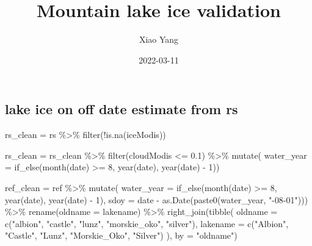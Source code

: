 \documentclass[
]{article}
\title{Mountain lake ice validation}
\author{Xiao Yang}
\date{2022-03-11}
\newenvironment{Shaded}{\begin{snugshade}}{\end{snugshade}}
\newcommand{\AttributeTok}[1]{\textcolor[rgb]{0.77,0.63,0.00}{#1}}
\newcommand{\DecValTok}[1]{\textcolor[rgb]{0.00,0.00,0.81}{#1}}
\newcommand{\FloatTok}[1]{\textcolor[rgb]{0.00,0.00,0.81}{#1}}
\newcommand{\FunctionTok}[1]{\textcolor[rgb]{0.00,0.00,0.00}{#1}}
\newcommand{\NormalTok}[1]{#1}
\newcommand{\OtherTok}[1]{\textcolor[rgb]{0.56,0.35,0.01}{#1}}
\newcommand{\SpecialCharTok}[1]{\textcolor[rgb]{0.00,0.00,0.00}{#1}}
\newcommand{\StringTok}[1]{\textcolor[rgb]{0.31,0.60,0.02}{#1}}
\begin{document}
\maketitle

\hypertarget{lake-ice-on-off-date-estimate-from-rs}{%
\subsection{lake ice on off date estimate from
rs}\label{lake-ice-on-off-date-estimate-from-rs}}

\begin{Shaded}
\begin{Highlighting}[]
\NormalTok{rs\_clean }\OtherTok{=}\NormalTok{ rs }\SpecialCharTok{\%\textgreater{}\%} \FunctionTok{filter}\NormalTok{(}\SpecialCharTok{!}\FunctionTok{is.na}\NormalTok{(iceModis))}

\NormalTok{rs\_clean }\OtherTok{=}\NormalTok{ rs\_clean }\SpecialCharTok{\%\textgreater{}\%} 
  \FunctionTok{filter}\NormalTok{(cloudModis }\SpecialCharTok{\textless{}=} \FloatTok{0.1}\NormalTok{) }\SpecialCharTok{\%\textgreater{}\%} 
  \FunctionTok{mutate}\NormalTok{(}
    \AttributeTok{water\_year =} \FunctionTok{if\_else}\NormalTok{(}\FunctionTok{month}\NormalTok{(date) }\SpecialCharTok{\textgreater{}=} \DecValTok{8}\NormalTok{, }\FunctionTok{year}\NormalTok{(date), }\FunctionTok{year}\NormalTok{(date) }\SpecialCharTok{{-}} \DecValTok{1}\NormalTok{))}

\NormalTok{ref\_clean }\OtherTok{=}\NormalTok{ ref }\SpecialCharTok{\%\textgreater{}\%} 
  \FunctionTok{mutate}\NormalTok{(}
    \AttributeTok{water\_year =} \FunctionTok{if\_else}\NormalTok{(}\FunctionTok{month}\NormalTok{(date) }\SpecialCharTok{\textgreater{}=} \DecValTok{8}\NormalTok{, }\FunctionTok{year}\NormalTok{(date), }\FunctionTok{year}\NormalTok{(date) }\SpecialCharTok{{-}} \DecValTok{1}\NormalTok{),}
    \AttributeTok{sdoy =}\NormalTok{ date }\SpecialCharTok{{-}} \FunctionTok{as.Date}\NormalTok{(}\FunctionTok{paste0}\NormalTok{(water\_year, }\StringTok{"{-}08{-}01"}\NormalTok{))) }\SpecialCharTok{\%\textgreater{}\%} 
  \FunctionTok{rename}\NormalTok{(}\AttributeTok{oldname =}\NormalTok{ lakename) }\SpecialCharTok{\%\textgreater{}\%} 
  \FunctionTok{right\_join}\NormalTok{(}\FunctionTok{tibble}\NormalTok{(}
    \AttributeTok{oldname =} \FunctionTok{c}\NormalTok{(}\StringTok{"albion"}\NormalTok{, }\StringTok{"castle"}\NormalTok{, }\StringTok{"lunz"}\NormalTok{, }\StringTok{"morskie\_oko"}\NormalTok{, }\StringTok{"silver"}\NormalTok{),}
    \AttributeTok{lakename =} \FunctionTok{c}\NormalTok{(}\StringTok{"Albion"}\NormalTok{, }\StringTok{"Castle"}\NormalTok{, }\StringTok{"Lunz"}\NormalTok{, }\StringTok{"Morskie\_Oko"}\NormalTok{, }\StringTok{"Silver"}\NormalTok{)}
\NormalTok{  ), }\AttributeTok{by =} \StringTok{"oldname"}\NormalTok{)}


\end{Highlighting}
\end{Shaded}
\end{document}
